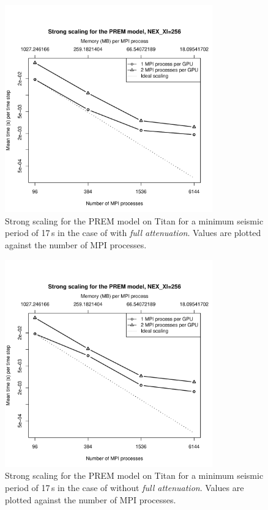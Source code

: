 \begin{figure}
  \centering
  \includegraphics[width=0.8\textwidth]{ch-workflow/figures/s256unq}
  \caption[Strong scaling of SPECFEM3D GLOBE for the PREM Earth model on Titan for 17\,s minimum period with
  full attenuation]
	{Strong scaling for the PREM model on Titan for a minimum seismic
	period of 17\,s in the case of with \emph{full attenuation}. Values are plotted
	against the number of MPI processes. }
   \label{fig:s256unq}
\end{figure}


\begin{figure}
  \centering
  \includegraphics[width=0.8\textwidth]{ch-workflow/figures/s256nounq}
  \caption[Strong scaling of SPECFEM3D GLOBE for the PREM Earth model on Titan for 17\,s minimum period w/o
  full attenuation]
	{Strong scaling for the PREM model on Titan for a minimum seismic
	period of 17\,s in the case of without \emph{full attenuation}.
  Values are plotted against the number of MPI processes. }
   \label{fig:s256nounq}
\end{figure}

